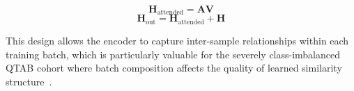 \documentclass[10pt,letterpaper]{article}
\newcommand{\hlpar}[1]{\leavevmode\colorbox{yellow!30}{\parbox{\dimexpr\linewidth-2\fboxsep\relax}{#1}}\vspace{2pt}}
\begin{document}
                                                                                                         \begin{equation}
                                                                                                             \mathbf{H}_{\text{attended}} = \mathbf{A}\mathbf{V}
                                                                                                             \end{equation}
                                                                                                             \begin{equation}
                                                                                                                 \mathbf{H}_{\text{out}} = \mathbf{H}_{\text{attended}} + \mathbf{H}
                                                                                                                 \end{equation}
                                                                                                                 \hlpar{This design allows the encoder to capture inter-sample relationships within each training batch, which is particularly valuable for the severely class-imbalanced QTAB cohort where batch composition affects the quality of learned similarity structure~\cite{ref51}.}
\end{document}
